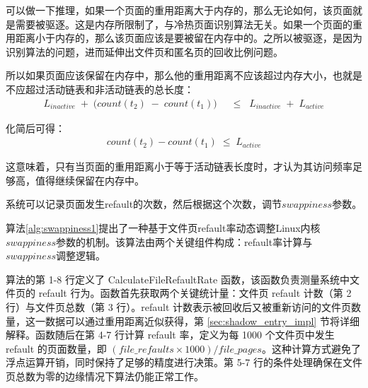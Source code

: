 可以做一下推理，如果一个页面的重用距离大于内存的，那么无论如何，该页面就是需要被驱逐。这是内存所限制了，与冷热页面识别算法无关。如果一个页面的重用距离小于内存的，那么该页面应该是要被留在内存中的。之所以被驱逐，是因为识别算法的问题，进而延伸出文件页和匿名页的回收比例问题。

所以如果页面应该保留在内存中，那么他的重用距离不应该超过内存大小，也就是不应超过活动链表和非活动链表的总长度：
\begin{align}
  \label{eq:active_condition_1}
  L_{inactive}
  \;+\;
  \bigl(count(t_2) \;-\; count(t_1)\bigr)
  &\;\;\le\;\;
  L_{inactive}
  \;+\;
  L_{active}
\end{align}

化简后可得：
\begin{align}
  \label{eq:active_condition}
  count(t_2) - {count}(t_1)
  \;\le\;
  L_{active}
\end{align}

这意味着，只有当页面的重用距离小于等于活动链表长度时，才认为其访问频率足够高，值得继续保留在内存中。

系统可以记录页面发生refault的次数，然后根据这个次数，调节\(swappiness\)参数。

算法\ref{alg:swappiness1}提出了一种基于文件页refault率动态调整Linux内核\(swappiness\)参数的机制。该算法由两个关键组件构成：refault率计算与\(swappiness\)调整逻辑。

算法的第 1-8 行定义了 CalculateFileRefaultRate 函数，该函数负责测量系统中文件页的 refault 行为。函数首先获取两个关键统计量：文件页 refault 计数（第 2 行）与文件页总数（第 3 行）。refault 计数表示被回收后又被重新访问的文件页数量，这一数据可以通过重用距离近似获得，第 \ref{sec:shadow_entry_impl} 节将详细解释。函数随后在第 4-7 行计算 refault 率，定义为每 1000 个文件页中发生 refault 的页面数量，即 \((file\_refaults \times 1000) / file\_pages\)。这种计算方式避免了浮点运算开销，同时保持了足够的精度进行决策。第 5-7 行的条件处理确保在文件页总数为零的边缘情况下算法仍能正常工作。

